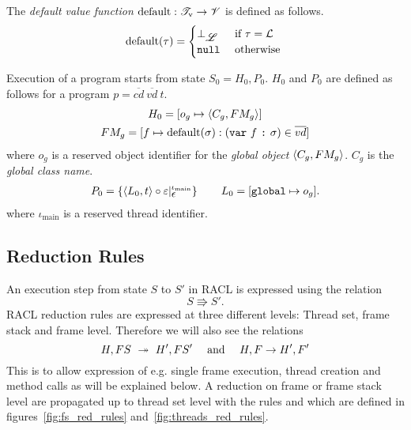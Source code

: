 \begin{definition}
  The \emph{default value function} $\mbox{$\mathrm{default}$}: \mathscr{T}_{\text{v}} \to \mathscr{V}$ is
  defined as follows.
  \begin{equation*}
    \mbox{$\mathrm{default}$}(\tau) =
    \begin{cases}
      \bot_{\mbox{$\mathscr{L}$}} & \text{ if } \tau = \mbox{$\mathcal{L}$} \\
      \mbox{\mdseries\texttt{null}}        & \text{ otherwise } 
    \end{cases}
  \end{equation*}
\end{definition}

\begin{definition} \label{def:state_zero}
  Execution of a program starts from state $S_0 = H_0, P_0$. $H_0$ and
  $P_0$ are defined as follows for a program $p =
  \overline{cd}~\overline{vd}~t$.
  \begin{equation*}
    \begin{gathered}
      H_0 = [o_g \mapsto \mbox{$\langle C_g, FM_g \rangle$}] \\
      FM_g = [f \mapsto \mbox{$\mathrm{default}$}(\sigma): (\mbox{\mdseries\texttt{var}~$f$~\texttt{:}~$\sigma$}) \in \overline{vd}]
    \end{gathered}
  \end{equation*}
  where $o_g$ is a reserved object identifier for the \emph{global object} $\mbox{$\langle C_g,
  FM_g \rangle$}$. $C_g$ is the \emph{global class name}.  
  \begin{equation*}
    \begin{gathered}
      P_0 = \left\{ \mbox{$\langle L_0, t \rangle$} \circ \varepsilon
      |_{\mbox{$\epsilon$}}^{\iota_{\text{main}}} \right\} \quad\quad
      L_0 = [ \mbox{\mdseries\texttt{global}} \mapsto o_g ].
    \end{gathered}
  \end{equation*}
  where $\iota_{\text{main}}$ is a reserved thread identifier.
\end{definition}


\subsection{Reduction Rules}%
\label{sub:reduction_rules}

An execution step from state $S$ to $S'$ in RACL is expressed using the relation
\begin{equation*}
  S \Rrightarrow S'.
\end{equation*}
RACL reduction rules are expressed at three different levels:
Thread set, frame stack and frame level. 
Therefore we will also see the relations 
\begin{equation*}
  H, FS \;\mbox{~$\twoheadrightarrow$~}\; H', FS' \quad \text{ and } \quad H, F\; \mbox{$\rightarrow$}\; H', F'
\end{equation*}
This is to allow expression of e.g. single frame execution,
thread creation and method calls as will be explained below. 
A reduction on frame or frame stack level are propagated up to thread set level
with the rules \EFProp{} and \EFSProp{} which are defined in
figures~\ref{fig:fs_red_rules} and~\ref{fig:threads_red_rules}.

